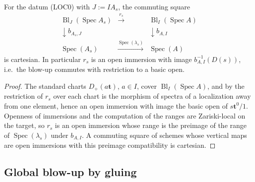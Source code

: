 \begin{proposition}
  \label{prop:nagata-affine-blowup-restrict}
  \leanok

  For the datum (LOC0) with $J:=IA_s$, the commuting square
  \[
    \begin{array}{ccc}
      \operatorname{Bl}_J(\operatorname{Spec}A_s)
        &\xrightarrow{\ r_s\ }
        &\operatorname{Bl}_I(\operatorname{Spec}A)\\
      \downarrow b_{A_s,J}& &\downarrow b_{A,I}\\
      \operatorname{Spec}(A_s)
        &\xrightarrow{\operatorname{Spec}(\lambda_s)}
        &\operatorname{Spec}(A)
    \end{array}
  \]
  is cartesian.  In particular $r_s$ is an open immersion with image
  $b_{A,I}^{-1}(D(s))$, i.e.\ the blow-up commutes with restriction to a
  basic open.
\end{proposition}

\begin{proof}
  \leanok
  The standard charts $D_+(a\mathbf t)$, $a\in I$, cover
  $\operatorname{Bl}_I(\operatorname{Spec}A)$, and by
   the restriction of $r_s$ over each
  chart is the morphism of spectra of a localization away from one
  element, hence an open immersion with image the basic open of
  $s\mathbf t^0/1$.  Openness of immersions and the computation of the
  ranges are Zariski-local on the target, so $r_s$ is an open immersion
  whose range is the preimage of the range of
  $\operatorname{Spec}(\lambda_s)$ under $b_{A,I}$.  A commuting square of
  schemes whose vertical maps are open immersions with this preimage
  compatibility is cartesian.
\end{proof}

\subsection{Global blow-up by gluing}

